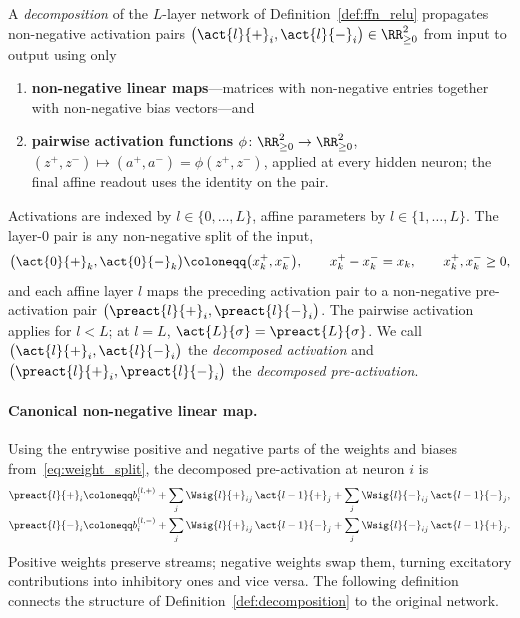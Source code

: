 \begin{definition}[Decomposition]\label{def:decomposition}
A \emph{decomposition} of the $L$-layer network of Definition~\ref{def:ffn_relu} propagates non-negative activation pairs $\bigl(\act{l}{+}_i, \act{l}{-}_i\bigr) \in \RR^2_{\ge 0}$ from input to output using only
\begin{enumerate}
	\item \textbf{non-negative linear maps}---matrices with non-negative entries together with non-negative bias vectors---and
	\item \textbf{pairwise activation functions} $\phi \colon \RR^2_{\ge 0} \to \RR^2_{\ge 0}$, $(z^+, z^-) \mapsto (a^+, a^-) = \phi(z^+, z^-)$, applied at every hidden neuron; the final affine readout uses the identity on the pair.
\end{enumerate}
Activations are indexed by $l \in \{0,\dots,L\}$, affine parameters by $l \in \{1,\dots,L\}$. The layer-$0$ pair is any non-negative split of the input,
\begin{equation}
	\bigl(\act{0}{+}_k, \act{0}{-}_k\bigr) \coloneqq \bigl(x_k^+, x_k^-\bigr),
	\qquad
	x_k^+ - x_k^- = x_k,
	\qquad
	x_k^+, x_k^- \ge 0,
	\label{eq:input_split_convention}
\end{equation}
and each affine layer $l$ maps the preceding activation pair to a non-negative pre-activation pair $\bigl(\preact{l}{+}_i, \preact{l}{-}_i\bigr)$. The pairwise activation applies for $l<L$; at $l=L$, $\act{L}{\sigma}=\preact{L}{\sigma}$. We call $\bigl(\act{l}{+}_i,\act{l}{-}_i\bigr)$ the \emph{decomposed activation} and $\bigl(\preact{l}{+}_i,\preact{l}{-}_i\bigr)$ the \emph{decomposed pre-activation}.
\end{definition}

\paragraph{Canonical non-negative linear map.}
Using the entrywise positive and negative parts of the weights and biases from~\eqref{eq:weight_split}, the decomposed pre-activation at neuron $i$ is
\begin{align}
	\preact{l}{+}_i &\coloneqq b_i^{(l,+)} + \sum_j \Wsig{l}{+}_{ij}\, \act{l-1}{+}_j + \sum_j \Wsig{l}{-}_{ij}\, \act{l-1}{-}_j,
	\label{eq:split_pos}\\
	\preact{l}{-}_i &\coloneqq b_i^{(l,-)} + \sum_j \Wsig{l}{+}_{ij}\, \act{l-1}{-}_j + \sum_j \Wsig{l}{-}_{ij}\, \act{l-1}{+}_j.
	\label{eq:split_neg}
\end{align}
Positive weights preserve streams; negative weights swap them, turning excitatory contributions into inhibitory ones and vice versa. The following definition connects the structure of Definition~\ref{def:decomposition} to the original network.

